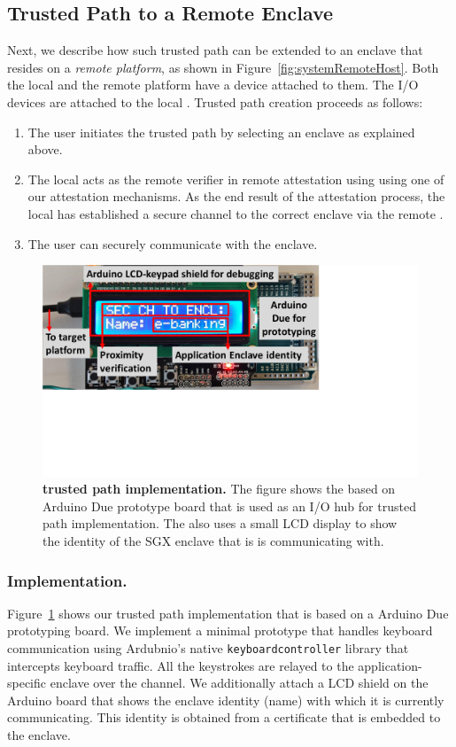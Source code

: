 \subsection{Trusted Path to a Remote Enclave} 

Next, we describe how such trusted path can be extended to an enclave that resides on a \emph{remote platform}, as shown in Figure~\ref{fig:systemRemoteHost}. Both the local and the remote platform have a \device device attached to them. The I/O devices are attached to the local \device. Trusted path creation proceeds as follows:

\begin{enumerate}
	\item[\one] The user initiates the trusted path by selecting an enclave as explained above.
	\item[\two] The local \device acts as the remote verifier in remote attestation using using one of our attestation mechanisms. As the end result of the attestation process, the local \device has established a secure channel to the correct enclave via the remote \device.
	\item[\three] The user can securely communicate with the enclave.
\end{enumerate}

 
\begin{figure}[t]
  \centering
    \includegraphics[trim={0 7.5cm 9cm 0}, clip, width=0.7\linewidth]{chapters/ProximiTEE/images/Setup1.pdf}
    \caption{\textbf{\name trusted path implementation.} The figure shows the \device based on Arduino Due prototype board that is used as an I/O hub for trusted path implementation. The \device also uses a small LCD display to show the identity of the SGX enclave that is is communicating with.}
    \label{fig:trustedPathImplementation}
\end{figure}


\subsubsection{Implementation.} 
Figure~\ref{fig:trustedPathImplementation} shows our trusted path implementation that is based on a Arduino Due prototyping board. We implement a minimal prototype that handles keyboard communication using Ardubnio's native \texttt{keyboardcontroller} library that intercepts keyboard traffic. All the keystrokes are relayed to the application-specific enclave over the \tls channel. 
%
We additionally attach a LCD shield on the Arduino board that shows the enclave identity (name) with which it is currently communicating. This identity is obtained from a certificate that is embedded to the enclave.



